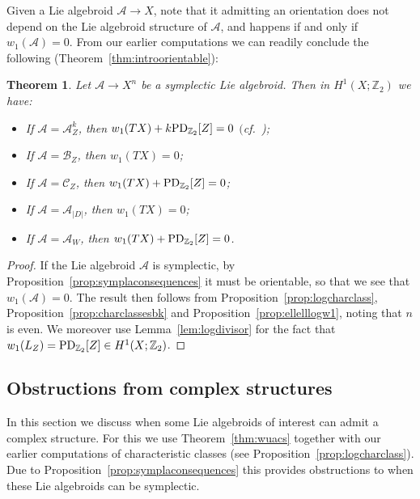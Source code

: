 \documentclass[10pt,a4paper]{amsart}
\numberwithin{equation}{section}
\newtheorem{Theorem}{Theorem}[section]
\begin{document}
Given a Lie algebroid $\mathcal{A} \to X$, note that it admitting an orientation does not depend on the Lie algebroid structure of $\mathcal{A}$, and happens if and only if $w_1(\mathcal{A}) = 0$. From our earlier computations we can readily conclude the following (Theorem~\ref{thm:introorientable}):

\begin{Theorem}\label{thm:orientable} Let $\mathcal{A} \to X^n$ be a symplectic Lie algebroid. Then in $H^1(X;\mathbb{Z}_2)$ we have:
	\begin{itemize}\itemsep=0pt
	\item If $\mathcal{A} = \mathcal{A}_Z^k$, then $w_1(TX) + k {\rm PD}_{\mathbb{Z}_2}[Z] = 0$ $($cf.\ {\rm \cite{MirandaPlanas18two,MirandaPlanas18})};
	\item If $\mathcal{A} = \mathcal{B}_Z$, then $w_1(TX) = 0$;
	\item If $\mathcal{A} = \mathcal{C}_Z$, then $w_1(TX) + {\rm PD}_{\mathbb{Z}_2}[Z] = 0$;
	\item If $\mathcal{A} = \mathcal{A}_{|D|}$, then $w_1(TX) = 0$;
	\item If $\mathcal{A} = \mathcal{A}_W$, then $w_1(TX) + {\rm PD}_{\mathbb{Z}_2}[Z] = 0$.
	\end{itemize}
\end{Theorem}

\begin{proof} If the Lie algebroid $\mathcal{A}$ is symplectic, by Proposition~\ref{prop:symplaconsequences} it must be orientable, so that we see that $w_1(\mathcal{A}) = 0$. The result then follows from Proposition~\ref{prop:logcharclass}, Proposition~\ref{prop:charclassesbk} and Proposition~\ref{prop:ellelllogw1}, noting that $n$ is even. We moreover use Lemma~\ref{lem:logdivisor} for the fact that $w_1(L_Z) = {\rm PD}_{\mathbb{Z}_2}[Z] \in H^1(X;\mathbb{Z}_2)$.
\end{proof}

\subsection{Obstructions from complex structures}\label{sec:existenceaacs}

In this section we discuss when some Lie algebroids of interest can admit a complex structure. For this we use Theorem~\ref{thm:wuacs} together with our earlier computations of characteristic classes (see Proposition~\ref{prop:logcharclass}). Due to Proposition~\ref{prop:symplaconsequences} this provides obstructions to when these Lie algebroids can be symplectic.
\end{document}
